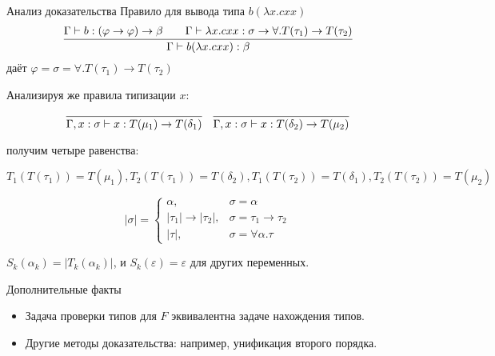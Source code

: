 \documentclass[aspectratio=169,dvipsnames,usenames]{beamer}
\begin{document}
\begin{frame}{Анализ доказательства}
Правило для вывода типа $b(\lambda x.cxx)$
$$
\infer{\Gamma\vdash b(\lambda x.cxx):\beta}{\Gamma\vdash b : (\varphi\rightarrow\varphi)\rightarrow\beta\quad\quad\Gamma\vdash \lambda x.cxx : \sigma \rightarrow \forall.T(\tau_1)\rightarrow T(\tau_2)}
$$
даёт $\varphi=\sigma=\forall.T(\tau_1)\rightarrow T(\tau_2)$

\vspace{0.1cm}
Анализируя же правила типизации $x$:

$$\infer{\Gamma,x:\sigma \vdash x : T(\mu_1)\rightarrow T(\delta_1)}{}\quad
\infer{\Gamma,x:\sigma \vdash x : T(\delta_2)\rightarrow T(\mu_2)}{}$$


получим четыре равенства:

$T_1(T(\tau_1))=T(\mu_1), T_2(T(\tau_1))=T(\delta_2), 
  T_1(T(\tau_2))=T(\delta_1), T_2(T(\tau_2))=T(\mu_2)$


$$|\sigma|=\left\{\begin{array}{ll}\alpha,&\sigma=\alpha\\
    |\tau_1|\rightarrow|\tau_2|,&\sigma=\tau_1\rightarrow\tau_2\\
    |\tau|,&\sigma=\forall \alpha.\tau\end{array}\right.$$

$S_k(\alpha_k) = |T_k(\alpha_k)|$, и $S_k(\varepsilon)=\varepsilon$ для других переменных.

\end{frame}

\begin{frame}{Дополнительные факты}
\begin{itemize}
\item Задача проверки типов для $F$ эквивалентна задаче нахождения типов.
\item Другие методы доказательства: например, унификация второго порядка.
\end{itemize}
\end{frame}
\end{document}
